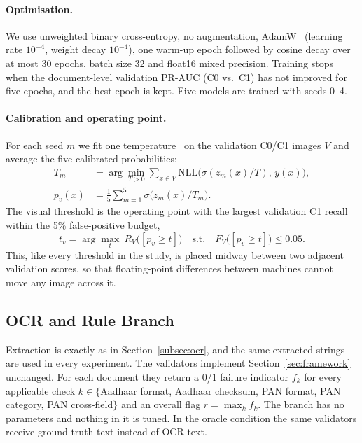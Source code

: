 \documentclass[conference]{IEEEtran}
\begin{document}
\paragraph*{Optimisation.} We use unweighted binary cross-entropy, no
augmentation, AdamW~\cite{adamw} (learning rate $10^{-4}$, weight decay
$10^{-4}$), one warm-up epoch followed by cosine decay over at most 30
epochs, batch size 32 and float16 mixed precision. Training stops when
the document-level validation PR-AUC (C0 vs.\ C1) has not improved for
five epochs, and the best epoch is kept. Five models are trained with
seeds 0--4.

\paragraph*{Calibration and operating point.} For each seed $m$ we fit
one temperature~\cite{guo} on the validation C0/C1 images $V$ and
average the five calibrated probabilities:
\begin{equation}
\label{eq:calib}
\begin{aligned}
T_m&=\arg\min_{T>0}\sum_{x\in V}\mathrm{NLL}\big(\sigma(z_m(x)/T),\,y(x)\big),\\
p_v(x)&=\frac{1}{5}\sum_{m=1}^{5}\sigma\big(z_m(x)/T_m\big).
\end{aligned}
\end{equation}
The visual threshold is the operating point with the largest validation
C1 recall within the 5\% false-positive budget,
\begin{equation}
\label{eq:threshold}
t_v=\arg\max_{t}\ R_{V}\big([p_v\ge t]\big)
\quad\text{s.t.}\quad F_{V}\big([p_v\ge t]\big)\le 0.05 .
\end{equation}
This, like every threshold in the study, is placed midway between two
adjacent validation scores, so that floating-point differences between
machines cannot move any image across it.

\subsection{OCR and Rule Branch}

Extraction is exactly as in Section~\ref{subsec:ocr}, and the same
extracted strings are used in every experiment. The validators
implement Section~\ref{sec:framework} unchanged. For each document they
return a 0/1 failure indicator $f_k$ for every applicable check
$k \in \{$Aadhaar format, Aadhaar checksum, PAN format, PAN category,
PAN cross-field$\}$ and an overall flag $r = \max_k f_k$. The branch has
no parameters and nothing in it is tuned. In the oracle condition the
same validators receive ground-truth text instead of OCR text.
\end{document}
